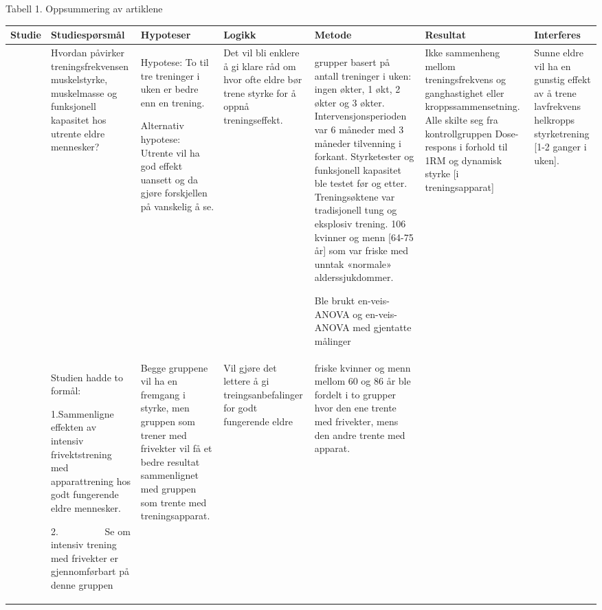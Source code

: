 \documentclass[
]{book}
\begin{document}
Tabell 1. Oppsummering av artiklene

\begin{longtable}[]{@{}
  >{\raggedright\arraybackslash}p{}
  >{\raggedright\arraybackslash}p{}
  >{\raggedright\arraybackslash}p{}
  >{\raggedright\arraybackslash}p{}
  >{\raggedright\arraybackslash}p{}
  >{\raggedright\arraybackslash}p{}
  >{\raggedright\arraybackslash}p{}@{}}
\toprule
Studie & Studiespørsmål & Hypoteser & Logikk & Metode & Resultat & Interferes \\
\midrule
\endhead
\citet{turpela2017} & Hvordan påvirker \textbar{} treningsfrekvensen muskelstyrke, muskelmasse og funksjonell kapasitet hos utrente eldre mennesker? & Hypotese: To til \textbar{} tre treninger i uken er bedre enn en trening.

Alternativ hypotese: Utrente vil ha god effekt uansett og da gjøre forskjellen på vanskelig å se. & Det vil bli enklere å \textbar{} gi klare råd om hvor ofte eldre bør trene styrke for å oppnå treningseffekt. & 4 grupper basert på \textbar{} antall treninger i uken: ingen økter, 1 økt, 2 økter og 3 økter. Intervensjonsperioden var 6 måneder med 3 måneder tilvenning i forkant. Styrketester og funksjonell kapasitet ble testet før og etter. Treningsøktene var tradisjonell tung og eksplosiv trening. 106 kvinner og menn {[}64-75 år{]} som var friske med unntak «normale» alderssjukdommer.

Ble brukt en-veis-ANOVA og en-veis-ANOVA med gjentatte målinger & Ikke sammenheng \textbar{} mellom treningsfrekvens og ganghastighet eller kroppssammensetning. Alle skilte seg fra kontrollgruppen Dose-respons i forhold til 1RM og dynamisk styrke {[}i treningsapparat{]} & Sunne eldre vil ha en gunstig effekt av å trene lavfrekvens helkropps styrketrening {[}1-2 ganger i uken{]}. \\
\citet{schott2019} & Studien hadde to \textbar{} formål:

1.Sammenligne effekten av intensiv frivektstrening med apparattrening hos godt fungerende eldre mennesker.

2.~~~~~~~~~ Se om intensiv trening med frivekter er gjennomførbart på denne gruppen & Begge gruppene vil ha \textbar{} en fremgang i styrke, men gruppen som trener med frivekter vil få et bedre resultat sammenlignet med gruppen som trente med treningsapparat. & Vil gjøre det lettere \textbar{} å gi treingsanbefalinger for godt fungerende eldre & 32 friske kvinner \textbar{} og menn mellom 60 og 86 år ble fordelt i to grupper hvor den ene trente med frivekter, mens den andre trente med apparat.


\end{longtable}
\end{document}
